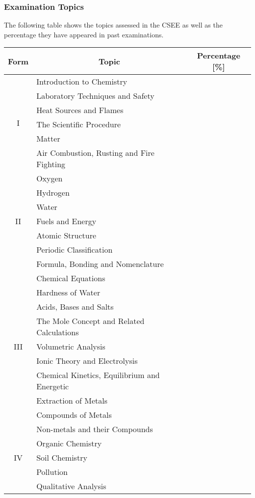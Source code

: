 \subsubsection{Examination Topics}
\noindent The following table shows the topics assessed in the CSEE as well as the percentage they have appeared in past examinations. 
\begin{center}
	\begin{tabular}{|c|l|c|} \hline
		Form & \multicolumn{1}{|c|}{Topic} & Percentage [\%] \\ \hline
		\multirow{6}{*}{I} 	& Introduction to Chemistry				& \\ \cline{2-3}
						& Laboratory Techniques and Safety 		& \\ \cline{2-3}
						& Heat Sources and Flames				& \\ \cline{2-3}
						& The Scientific Procedure				& \\ \cline{2-3}
						& Matter							 	& \\ \cline{2-3}
						& Air Combustion, Rusting and Fire Fighting	& \\ \hline
		\multirow{7}{*}{II} 	& Oxygen			 					& \\ \cline{2-3}
						& Hydrogen					 		& \\ \cline{2-3}
						& Water								& \\ \cline{2-3}
						& Fuels and Energy						& \\ \cline{2-3}
						& Atomic Structure					 	& \\ \cline{2-3}
						& Periodic Classification		 			& \\ \cline{2-3}
						& Formula, Bonding and Nomenclature		& \\ \hline
		\multirow{9}{*}{III}	& Chemical Equations					& \\ \cline{2-3}
						& Hardness of Water 					& \\ \cline{2-3}
						& Acids, Bases and Salts					& \\ \cline{2-3}
						& The Mole Concept and Related Calculations	& \\ \cline{2-3}
						& Volumetric Analysis					& \\ \cline{2-3}
						& Ionic Theory and Electrolysis				& \\ \cline{2-3}
						& Chemical Kinetics, Equilibrium and Energetic & \\ \cline{2-3}
						& Extraction of Metals					& \\ \cline{2-3}
						& Compounds of Metals					& \\ \hline
		\multirow{5}{*}{IV}	& Non-metals and their Compounds 			& \\ \cline{2-3}
						& Organic Chemistry						& \\ \cline{2-3}
						& Soil Chemistry						& \\ \cline{2-3}
						& Pollution							& \\ \cline{2-3}
						& Qualitative Analysis					& \\ \hline
	\end{tabular}
\end{center}



















